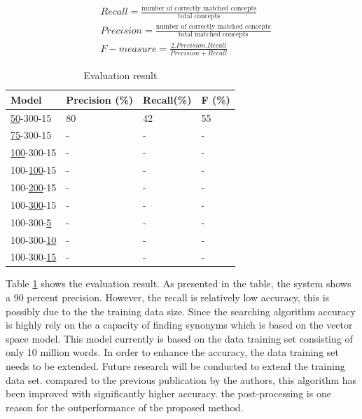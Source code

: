 \documentclass[Journal, InsideFigs, DoubleSpace]{ascelike} %
\begin{document}
%
\begin{align} 
&Recall = \frac{\text{number of correctly matched concepts}}{\text{total concepts}}  \\ 
&Precision = \frac{\text{number of correctly matched concepts}}{\text{total matched concepts}}  \\
&F-measure = \frac{2.Precision.Recall}{Precision+Recall}
\end{align}
%
\begin{table} [b] 
\caption{Evaluation result}
\label{table:synonym_eval}
\centering
\small
\renewcommand{\arraystretch}{1.25}
\begin{tabular}{l l l l }
\hline
\hline
 \textbf{Model} & \textbf{Precision (\%)}  & \textbf{Recall(\%)} & \textbf{F (\%)}\\
 \hline
	\underline{50}-300-15	& 80 	& 42 	& 55\\
	\underline{75}-300-15	&-		&-		&-\\
	\underline{100}-300-15	&-		&-		&-\\
	\hline
	100-\underline{100}-15	&-		&-		&-\\
	100-\underline{200}-15	&-		&-		&-\\
	100-\underline{300}-15	&-		&-		&-\\
	\hline
	100-300-\underline{5}	&-		&-		&-\\
	100-300-\underline{10}	&-		&-		&-\\
	100-300-\underline{15}	&-		&-		&-\\

\hline
\hline
\end{tabular}
\normalsize
\end{table}

%
Table \ref{table:synonym_eval} shows the evaluation result. As presented in the table, the system shows a 90 percent precision. However, the recall is relatively low accuracy, this is possibly due to the the training data size. Since the searching algorithm accuracy is highly rely on the a capacity of finding synonyms which is based on the vector space model. This model currently is based on the data training set consisting of only 10 million words. In order to enhance the accuracy, the data training set needs to be extended. Future research will be conducted to extend the training data set. 
%
compared to the previous publication by the authors, this algorithm has been improved with significantly higher accuracy. the post-processing is one reason for the outperformance of the proposed method. 
%
\end{document}
